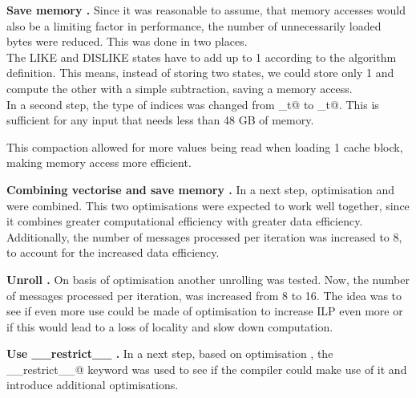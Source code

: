 \documentclass[letterpaper]{article}
\newcommand{\mypar}[1]{{\bf #1.}}
\begin{document}
\mypar{Save memory }
Since it was reasonable to assume, that memory accesses would also be a limiting factor in performance, the number of unnecessarily loaded bytes were reduced. This was done in two places.\\
The LIKE and DISLIKE states have to add up to 1 according to the algorithm definition. This means, instead of storing two states, we could store only 1 and compute the other with a simple subtraction, saving a memory access.\\
In a second step, the type of indices was changed from \verb@size_t@ to _t@. This is sufficient for any input that needs less than 48 GB of memory. 

This compaction allowed for more values being read when loading 1 cache block, making memory access more efficient.


\mypar{Combining vectorise and save memory }
In a next step, optimisation  and  were combined. This two optimisations were expected to work well together, since it combines greater computational efficiency with greater data efficiency. Additionally, the number of messages processed per iteration was increased to 8, to account for the increased data efficiency.


\mypar{Unroll }
On basis of optimisation  another unrolling was tested. Now, the number of messages processed per iteration, was increased from 8 to 16. The idea was to see if even more use could be made of optimisation  to increase ILP even more or if this would lead to a loss of locality and slow down computation.


\mypar{Use \_\_restrict\_\_ }
In a next step, based on optimisation , the \verb@__restrict__@ keyword was used to see if the compiler could make use of it and introduce additional optimisations. 
\end{document}
